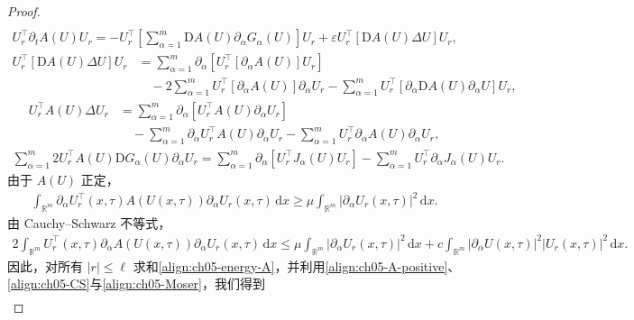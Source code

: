\documentclass[../../main.tex]{subfiles}
\begin{document}
\begin{proof}
\begin{align}
\end{align}
\begin{align}
U_{r}^{\top}\partial_{t}A(U)U_{r}=-U_{r}^{\top}\left[\sum_{\alpha=1}^{m}\mathrm{D}A(U)\partial_{\alpha}G_{\alpha}(U)\right]U_{r}+\varepsilon U_{r}^{\top}[\mathrm{D}A(U)\Delta U]U_{r},\label{align:ch05-id2}
\end{align}
\begin{align}
U_{r}^{\top}[\mathrm{D}A(U)\Delta U]U_{r}&=\sum_{\alpha=1}^{m}\partial_{\alpha}[U_{r}^{\top}[\partial_{\alpha}A(U)]U_{r}]\nonumber\\
&\quad-2\sum_{\alpha=1}^{m}U_{r}^{\top}[\partial_{\alpha}A(U)]\partial_{\alpha}U_{r}-\sum_{\alpha=1}^{m}U_{r}^{\top}[\partial_{\alpha}\mathrm{D}A(U)\partial_{\alpha}U]U_{r},\label{align:ch05-id3}
\end{align}
\begin{align}
U_{r}^{\top}A(U)\Delta U_{r}&=\sum_{\alpha=1}^{m}\partial_{\alpha}[U_{r}^{\top}A(U)\partial_{\alpha}U_{r}]\nonumber\\
&\quad-\sum_{\alpha=1}^{m}\partial_{\alpha}U_{r}^{\top}A(U)\partial_{\alpha}U_{r}-\sum_{\alpha=1}^{m}U_{r}^{\top}\partial_{\alpha}A(U)\partial_{\alpha}U_{r},\label{align:ch05-id4}
\end{align}
\begin{align}
\sum_{\alpha=1}^{m}2U_{r}^{\top}A(U)\mathrm{D}G_{\alpha}(U)\partial_{\alpha}U_{r}
=\sum_{\alpha=1}^{m}\partial_{\alpha}[U_{r}^{\top}J_{\alpha}(U)U_{r}]-\sum_{\alpha=1}^{m}U_{r}^{\top}\partial_{\alpha}J_{\alpha}(U)U_{r}.\label{align:ch05-id5}
\end{align}
由于 $A(U)$ 正定，
\begin{align}
\int_{\mathbb{R}^{m}}\partial_{\alpha}U_{r}^{\top}(x,\tau)A(U(x,\tau))\partial_{\alpha}U_{r}(x,\tau)\,\mathrm{d}x\geqslant\mu\int_{\mathbb{R}^{m}}|\partial_{\alpha}U_{r}(x,\tau)|^{2}\,\mathrm{d}x.\label{align:ch05-A-positive}
\end{align}
由 Cauchy--Schwarz 不等式，
\begin{align}
2\int_{\mathbb{R}^{m}}U_{r}^{\top}(x,\tau)\partial_{\alpha}A(U(x,\tau))\partial_{\alpha}U_{r}(x,\tau)\,\mathrm{d}x
\leqslant\mu\int_{\mathbb{R}^{m}}|\partial_{\alpha}U_{r}(x,\tau)|^{2}\,\mathrm{d}x+c\int_{\mathbb{R}^{m}}|\partial_{\alpha}U(x,\tau)|^{2}|U_{r}(x,\tau)|^{2}\,\mathrm{d}x.\label{align:ch05-CS}
\end{align}
因此，对所有 $|r|\leqslant\ell$ 求和\eqref{align:ch05-energy-A}，并利用\eqref{align:ch05-A-positive}、\eqref{align:ch05-CS}与\eqref{align:ch05-Moser}，我们得到
\begin{align}

\end{align}
\end{proof}
\end{document}
